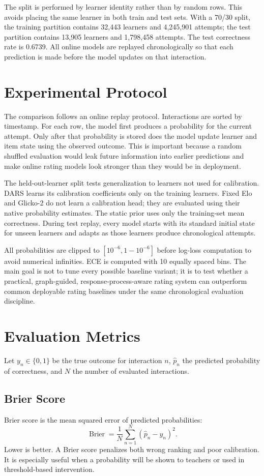 \documentclass[conference]{IEEEtran}
\begin{document}
The split is performed by learner identity rather than by random rows. This avoids placing the same learner in both train and test sets. With a 70/30 split, the training partition contains 32,443 learners and 4,245,901 attempts; the test partition contains 13,905 learners and 1,798,458 attempts. The test correctness rate is 0.6739. All online models are replayed chronologically so that each prediction is made before the model updates on that interaction.

\section{Experimental Protocol}
The comparison follows an online replay protocol. Interactions are sorted by timestamp. For each row, the model first produces a probability for the current attempt. Only after that probability is stored does the model update learner and item state using the observed outcome. This is important because a random shuffled evaluation would leak future information into earlier predictions and make online rating models look stronger than they would be in deployment.

The held-out-learner split tests generalization to learners not used for calibration. DARS learns its calibration coefficients only on the training learners. Fixed Elo and Glicko-2 do not learn a calibration head; they are evaluated using their native probability estimates. The static prior uses only the training-set mean correctness. During test replay, every model starts with its standard initial state for unseen learners and adapts as those learners produce chronological attempts.

All probabilities are clipped to $[10^{-6},1-10^{-6}]$ before log-loss computation to avoid numerical infinities. ECE is computed with 10 equally spaced bins. The main goal is not to tune every possible baseline variant; it is to test whether a practical, graph-guided, response-process-aware rating system can outperform common deployable rating baselines under the same chronological evaluation discipline.

\section{Evaluation Metrics}
Let $y_n\in\{0,1\}$ be the true outcome for interaction $n$, $\hat{p}_n$ the predicted probability of correctness, and $N$ the number of evaluated interactions.

\subsection{Brier Score}
Brier score is the mean squared error of predicted probabilities:
\begin{equation}
\operatorname{Brier}=\frac{1}{N}\sum_{n=1}^{N}(\hat{p}_n-y_n)^2.
\end{equation}
Lower is better. A Brier score penalizes both wrong ranking and poor calibration. It is especially useful when a probability will be shown to teachers or used in threshold-based intervention.
\end{document}
